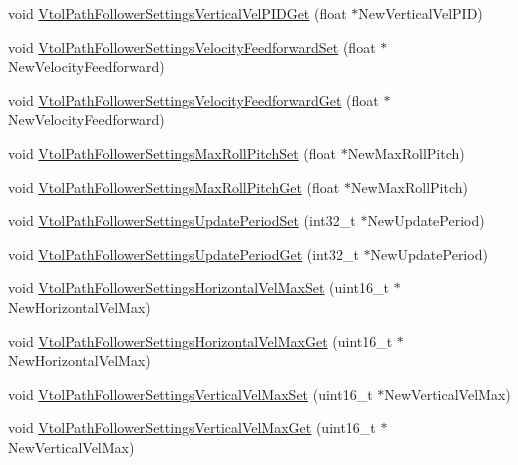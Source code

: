 \begin{DoxyCompactItemize}
\item 
void \hyperlink{group___vtol_path_follower_settings_gac03236a995b7913b023b52b11ccec04c}{\-Vtol\-Path\-Follower\-Settings\-Vertical\-Vel\-P\-I\-D\-Get} (float $\ast$\-New\-Vertical\-Vel\-P\-I\-D)
\item 
void \hyperlink{group___vtol_path_follower_settings_gae9b2517c8a1871f4d3a8bf9c7580eaa7}{\-Vtol\-Path\-Follower\-Settings\-Velocity\-Feedforward\-Set} (float $\ast$\-New\-Velocity\-Feedforward)
\item 
void \hyperlink{group___vtol_path_follower_settings_ga9eaed1ff3678ae55175c1a9b22d7952d}{\-Vtol\-Path\-Follower\-Settings\-Velocity\-Feedforward\-Get} (float $\ast$\-New\-Velocity\-Feedforward)
\item 
void \hyperlink{group___vtol_path_follower_settings_ga03f09985cb99f6122cda89ef3ef1207b}{\-Vtol\-Path\-Follower\-Settings\-Max\-Roll\-Pitch\-Set} (float $\ast$\-New\-Max\-Roll\-Pitch)
\item 
void \hyperlink{group___vtol_path_follower_settings_ga321ff209a7cf1307863dc1dd2291b15d}{\-Vtol\-Path\-Follower\-Settings\-Max\-Roll\-Pitch\-Get} (float $\ast$\-New\-Max\-Roll\-Pitch)
\item 
void \hyperlink{group___vtol_path_follower_settings_ga21826e2f37676129d36011fe295c1beb}{\-Vtol\-Path\-Follower\-Settings\-Update\-Period\-Set} (int32\-\_\-t $\ast$\-New\-Update\-Period)
\item 
void \hyperlink{group___vtol_path_follower_settings_gab8cf905b21198621ce039fa869bdac7a}{\-Vtol\-Path\-Follower\-Settings\-Update\-Period\-Get} (int32\-\_\-t $\ast$\-New\-Update\-Period)
\item 
void \hyperlink{group___vtol_path_follower_settings_ga220363409b66d89822134dbc7907f797}{\-Vtol\-Path\-Follower\-Settings\-Horizontal\-Vel\-Max\-Set} (uint16\-\_\-t $\ast$\-New\-Horizontal\-Vel\-Max)
\item 
void \hyperlink{group___vtol_path_follower_settings_ga7572d01bdc70df46cde02259f48e942b}{\-Vtol\-Path\-Follower\-Settings\-Horizontal\-Vel\-Max\-Get} (uint16\-\_\-t $\ast$\-New\-Horizontal\-Vel\-Max)
\item 
void \hyperlink{group___vtol_path_follower_settings_gab3568a3260fc8fd8a55affd2145767b3}{\-Vtol\-Path\-Follower\-Settings\-Vertical\-Vel\-Max\-Set} (uint16\-\_\-t $\ast$\-New\-Vertical\-Vel\-Max)
\item 
void \hyperlink{group___vtol_path_follower_settings_ga92260d1d955c88f56e92b33ff0677ece}{\-Vtol\-Path\-Follower\-Settings\-Vertical\-Vel\-Max\-Get} (uint16\-\_\-t $\ast$\-New\-Vertical\-Vel\-Max)

\end{DoxyCompactItemize}
